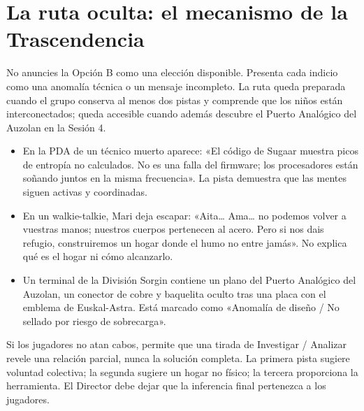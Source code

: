 \section{La ruta oculta: el mecanismo de la Trascendencia}

 No anuncies la Opción B como una elección disponible. Presenta cada indicio como una anomalía técnica o un mensaje incompleto. La ruta queda preparada cuando el grupo conserva al menos dos pistas y comprende que los niños están interconectados; queda accesible cuando además descubre el Puerto Analógico del Auzolan en la Sesión 4.

\begin{itemize}
  \item {} En la PDA de un técnico muerto aparece: «El código de Sugaar muestra picos de entropía no calculados. No es una falla del firmware; los procesadores están soñando juntos en la misma frecuencia». La pista demuestra que las mentes siguen activas y coordinadas.
  \item {} En un walkie-talkie, Mari deja escapar: «Aita\ldots{} Ama\ldots{} no podemos volver a vuestras manos; nuestros cuerpos pertenecen al acero. Pero si nos dais refugio, construiremos un hogar donde el humo no entre jamás». No explica qué es el hogar ni cómo alcanzarlo.
  \item {} Un terminal de la División Sorgin contiene un plano del Puerto Analógico del Auzolan, un conector de cobre y baquelita oculto tras una placa con el emblema de Euskal-Astra. Está marcado como «Anomalía de diseño / No sellado por riesgo de sobrecarga».
\end{itemize}

 Si los jugadores no atan cabos, permite que una tirada de Investigar / Analizar revele una relación parcial, nunca la solución completa. La primera pista sugiere voluntad colectiva; la segunda sugiere un hogar no físico; la tercera proporciona la herramienta. El Director debe dejar que la inferencia final pertenezca a los jugadores.
